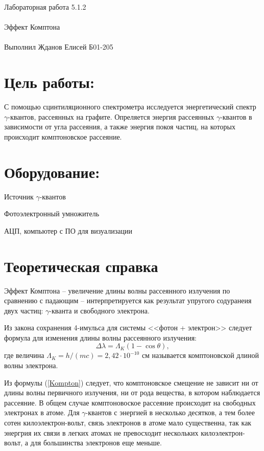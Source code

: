\documentclass{astroedu-lab}
\begin{document}
\pagestyle{plain}

\begin{problem}{\huge Лабораторная работа 5.1.2\\\\Эффект Комптона\\\\Выполнил Жданов Елисей Б01-205}

\section{Цель работы:}

С помощью сцинтиляционного спектрометра исследуется энергетический спектр $\gamma$-квантов, рассеянных на графите. Опреляется энергия рассеянных $\gamma$-квантов в зависимости от угла рассеяния, а также энергия покоя частиц, на которых происходит комптоновское рассеяние.

\section{Оборудование:}

Источник $\gamma$-квантов

Фотоэлектронный умножитель

АЦП, компьютер с ПО для визуализации

\section{Теоретическая справка}

Эффект Комптона -- увеличение длины волны рассеянного излучения по сравнению с падающим -- интерпретируется как результат упругого содуранеия двух частиц: $\gamma$-кванта и свободного электрона.
	
	Из закона сохранения 4-имульса для системы <<фотон + электрон>> следует формула для изменения длины волны рассеянного излучения:
	\begin{equation}
		\label{Kompton}
		\tag{$\star$}
		\Delta \lambda = \Lambda_K(1-\cos\theta),
	\end{equation}
	где величина $\Lambda_K = h/(mc) = 2,42 \cdot 10^{-10}$ см называется комптоновской длиной волны электрона.
	
	Из формулы (\ref{Kompton}) следует, что комптоновское смещение не зависит ни от длины волны первичного излучения, ни от рода вещества, в котором наблюдается рассеяние. В общем случае комптоновоское рассеяние происходит на свободных электронах в атоме. Для $\gamma$-квантов с энергией в несколько десятков, а тем более сотен килоэлектрон-вольт, связь электронов в атоме мало существенна, так как энергрия их связи в легких атомах не превосходит нескольких килоэлектрон-вольт, а для большинства электронов еще меньше.
	

\end{problem}
\end{document}
